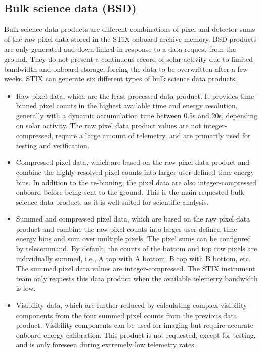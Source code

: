 \documentclass[referee]{preaa} %
\begin{document}
\subsection{Bulk science data (BSD)}
Bulk science data products are different combinations of pixel and detector sums of the raw pixel data stored in the STIX onboard archive memory. BSD products are only generated and down-linked in response to a data request from the ground. They do not present a continuous record of solar activity due to limited bandwidth and onboard storage, forcing the data to be overwritten after a few weeks. STIX can generate six different types of bulk science data products: 
\begin{itemize}
 \item Raw pixel data, which are the least processed data product. It provides time-binned pixel counts in the highest available time and energy resolution, generally with a dynamic accumulation time between 0.5s and 20s, depending on solar activity. The raw pixel data product values are not integer-compressed, require a large amount of telemetry, and are primarily used for testing and verification.
 
\item Compressed pixel data, which are based on the raw pixel data product and combine the highly-resolved pixel counts into larger user-defined time-energy bins. In addition to the re-binning, the pixel data are also integer-compressed onboard before being sent to the ground. This is the main requested bulk science data product, as it is well-suited for scientific analysis. 

\item Summed and compressed pixel data, which are based on the raw pixel data product and combine the raw pixel counts into larger user-defined time-energy bins and sum over multiple pixels. The pixel sums can be configured by telecommand. By default, the counts of the bottom and top row pixels are individually summed, i.e., A top with A bottom, B top with B bottom, etc. The summed pixel data values are integer-compressed. The STIX instrument team only requests this data product when the available telemetry bandwidth is low.

\item Visibility data, which are further reduced by calculating complex visibility components from the four summed pixel counts from the previous data product. Visibility components can be used for imaging but require accurate onboard energy calibration. This product is not requested, except for testing, and is only foreseen during extremely low telemetry rates.


\end{itemize}
\end{document}
